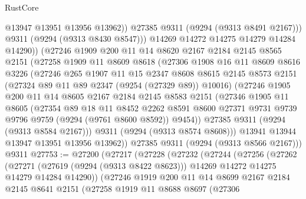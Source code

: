 \begin{lexlean}{RustCore}
\begin{coremodule}
                @13947
                @13951
                @13956
                @13962))
            @27385
            @9311
            (@9294 (@9313 @8491 @2167)))
          @9311
          (@9294 (@9313 @8430 @8547)))
        @14269
        @14272
        @14275
        @14279
        @14284
        @14290))
    (@27246
      @1909
      @200
      @11
      @14
      @8620
      @2167
      @2184
      @2145
      @8565
      @2151
      (@27258
        @1909
        @11
        @8609
        @8618
        (@27306
          @1908
          @16
          @11
          @8609
          @8616
          @3226
          (@27246
            @265
            @1907
            @11
            @15
            @2347
            @8608
            @8615
            @2145
            @8573
            @2151
            (@27324 @89 @11 @89 @2347 (@9254 (@27329 @89)) @10016)
            (@27246
              @1905
              @200
              @11
              @14
              @8605
              @2167
              @2184
              @2145
              @8583
              @2151
              (@27346
                @1905
                @11
                @8605
                (@27354
                  @89
                  @18
                  @11
                  @8452
                  @2262
                  @8591
                  @8600
                  @27371
                  @9731
                  @9739
                  @9796
                  @9759
                  (@9294 (@9761 @8600 @8592))
                  @9454))
              @27385
              @9311
              (@9294 (@9313 @8584 @2167)))
            @9311
            (@9294 (@9313 @8574 @8608)))
          @13941
          @13944
          @13947
          @13951
          @13956
          @13962))
      @27385
      @9311
      (@9294 (@9313 @8566 @2167)))
    @9311
@27753 := @27200
    (@27217
      (@27228
        (@27232
          (@27244
            (@27256
              (@27262
                (@27271
                  (@27619 (@9294 (@9313 @8422 @8623)))
                  @14269
                  @14272
                  @14275
                  @14279
                  @14284
                  @14290))
              (@27246
                @1919
                @200
                @11
                @14
                @8699
                @2167
                @2184
                @2145
                @8641
                @2151
                (@27258
                  @1919
                  @11
                  @8688
                  @8697
                  (@27306

\end{coremodule}
\end{lexlean}
